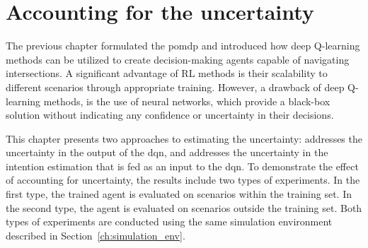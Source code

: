 \chapter{Accounting for the uncertainty}\label{ch:uncertainty}

The previous chapter formulated the \gls{pomdp} and introduced how deep Q-learning methods can be utilized to create decision-making agents capable of navigating intersections. A significant advantage of RL methods is their scalability to different scenarios through appropriate training. However, a drawback of deep Q-learning methods, is the use of neural networks, which provide a black-box solution without indicating any confidence or uncertainty in their decisions.

This chapter presents two approaches to estimating the uncertainty: \paperEnsamble addresses the uncertainty in the output of the \gls{dqn}, and \paperBelief addresses the uncertainty in the intention estimation that is fed as an input to the \gls{dqn}.
To demonstrate the effect of accounting for uncertainty, the results include two types of experiments. In the first type, the trained agent is evaluated on scenarios within the training set. In the second type, the agent is evaluated on scenarios outside the training set. Both types of experiments are conducted using the same simulation environment described in Section~\ref{ch:simulation_env}.

